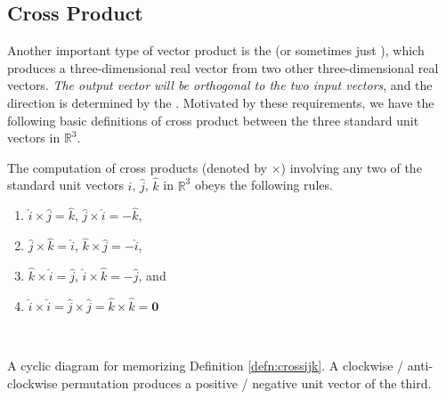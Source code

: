 \subsection{Cross Product}
\label{section:crossprod}
Another important type of vector product is the  (or sometimes just ), which produces a three-dimensional real vector from two other three-dimensional real vectors. \textit{The output vector will be orthogonal to the two input vectors}, and the direction is determined by the . Motivated by these requirements, we have the following basic definitions of cross product between the three standard unit vectors in $\mathbb{R}^3$.
\begin{defn}
\label{defn:crossijk}
The computation of cross products (denoted by $\times$) involving any two of the standard unit vectors $\hat{i}$, $\hat{j}$, $\hat{k}$ in $\mathbb{R}^3$ obeys the following rules.
\begin{enumerate}
\item $\hat{i} \times \hat{j} = \hat{k}$, $\hat{j} \times \hat{i} = -\hat{k}$,
\item $\hat{j} \times \hat{k} = \hat{i}$, $\hat{k} \times \hat{j} = -\hat{i}$,
\item $\hat{k} \times \hat{i} = \hat{j}$, $\hat{i} \times \hat{k} = -\hat{j}$, and
\item $\hat{i} \times \hat{i} = \hat{j} \times \hat{j} = \hat{k} \times \hat{k} = \textbf{0}$
\end{enumerate}
\end{defn}
\begin{minipage}{0.45\textwidth}
\begin{center}
 \\
\end{center}
A cyclic diagram for memorizing Definition \ref{defn:crossijk}. A clockwise / anti-clockwise permutation produces a positive / negative unit vector of the third.
\end{minipage}

